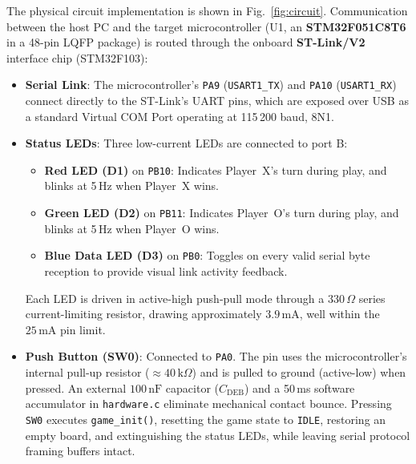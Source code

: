 The physical circuit implementation is shown in Fig.~\ref{fig:circuit}.
Communication between the host PC and the target microcontroller (U1, an \textbf{STM32F051C8T6} in a 48-pin LQFP package) is routed through the onboard \textbf{ST-Link/V2} interface chip (STM32F103):
\begin{itemize}
    \item \textbf{Serial Link}: The microcontroller's \texttt{PA9} (\texttt{USART1\_TX}) and \texttt{PA10} (\texttt{USART1\_RX}) connect directly to the ST-Link's UART pins, which are exposed over USB as a standard Virtual COM Port operating at 115\,200 baud, 8N1.
    \item \textbf{Status LEDs}: Three low-current LEDs are connected to port B:
    \begin{itemize}
        \item \textbf{Red LED (D1)} on \texttt{PB10}: Indicates Player~X's turn during play, and blinks at 5\,Hz when Player~X wins.
        \item \textbf{Green LED (D2)} on \texttt{PB11}: Indicates Player~O's turn during play, and blinks at 5\,Hz when Player~O wins.
        \item \textbf{Blue Data LED (D3)} on \texttt{PB0}: Toggles on every valid serial byte reception to provide visual link activity feedback.
    \end{itemize}
    Each LED is driven in active-high push-pull mode through a $330\,\Omega$ series current-limiting resistor, drawing approximately $3.9\,\text{mA}$, well within the $25\,\text{mA}$ pin limit.
    \item \textbf{Push Button (SW0)}: Connected to \texttt{PA0}. The pin uses the microcontroller's internal pull-up resistor ($\approx 40\,\text{k}\Omega$) and is pulled to ground (active-low) when pressed. An external $100\,\text{nF}$ capacitor (\(C_{\text{DEB}}\)) and a 50\,ms software accumulator in \texttt{hardware.c} eliminate mechanical contact bounce. Pressing \texttt{SW0} executes \texttt{game\_init()}, resetting the game state to \texttt{IDLE}, restoring an empty board, and extinguishing the status LEDs, while leaving serial protocol framing buffers intact.
\end{itemize}
